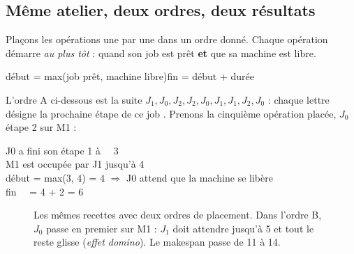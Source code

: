 \documentclass[11pt,a4paper]{article}
\newcommand{\op}[5]{%
  \fill[#4,rounded corners=1.5pt] (#2,{2-#1+0.13}) rectangle (#3,{2-#1+0.87});
  \node[white,font=\scriptsize\bfseries] at ({(#2+#3)/2},{2-#1+0.5}) {#5};}
\newcommand{\ganttfond}[1]{%
  \foreach \t in {0,...,#1} \draw[grille] (\t,0) -- (\t,3);
  \foreach \m in {0,1,2} {
    \draw[gris!50] (0,{2-\m}) rectangle (#1,{3-\m});
    \node[anchor=east,font=\small\ttfamily,text=gris] at (-0.15,{2-\m+0.5}) {M\m};}
  \foreach \t in {0,2,...,#1} \node[font=\scriptsize\ttfamily,text=gris] at (\t,-0.3) {\t};}
\newcommand{\makespanligne}[1]{%
  \draw[accent,very thick,dashed] (#1,-0.05) -- (#1,3.25);
  \node[accent,font=\small\ttfamily\bfseries,fill=white,inner sep=1pt] at (#1,3.5) {makespan = #1};}
\begin{document}
\subsection{Même atelier, deux ordres, deux résultats}

Plaçons les opérations une par une dans un ordre donné. Chaque opération démarre
\emph{au plus tôt} : quand son job est prêt \textbf{et} que sa machine est libre.

\begin{calcul}
début = max(job prêt, machine libre)\qquad fin = début + durée
\end{calcul}

L'ordre A ci-dessous est la suite $J_1, J_0, J_2, J_2, J_0, J_1, J_1, J_2, J_0$ : chaque
lettre désigne \og la prochaine étape de ce job \fg{}. Prenons la cinquième opération
placée, $J_0$ étape 2 sur M1 :

\begin{calcul}
J0 a fini son étape 1 à \ \ 3\\
M1 est occupée par J1 jusqu'à 4\\
début = max(3, 4) = 4 \quad $\Rightarrow$ J0 attend que la machine se libère\\
fin \ \ = 4 + 2 = 6
\end{calcul}

\begin{figure}[h]
\centering
{}

\vspace{6mm}
\caption{Les mêmes recettes avec deux ordres de placement. Dans l'ordre B, $J_0$ passe
en premier sur M1 : $J_1$ doit attendre jusqu'à 5 et tout le reste glisse
(\emph{effet domino}). Le makespan passe de 11 à 14.}
\label{fig:gantt-ab}
\end{figure}
\end{document}
